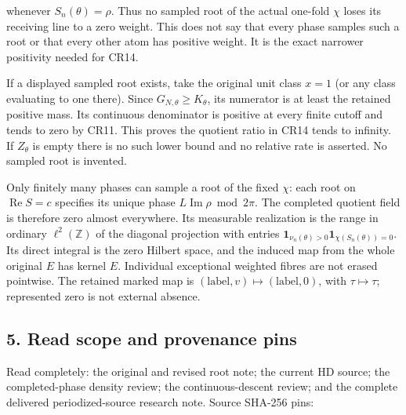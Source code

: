 \documentclass{article}
\begin{document}
whenever \(S_n(\theta)=\rho\). Thus no sampled root of the actual one-fold \(\chi\) loses its receiving line to a zero weight. This does not say that every phase samples such a root or that every other atom has positive weight. It is the exact narrower positivity needed for CR14.

If a displayed sampled root exists, take the original unit class \(x=1\) (or any class evaluating to one there). Since \(G_{N,\theta}\ge K_\theta\), its numerator is at least the retained positive mass. Its continuous denominator is positive at every finite cutoff and tends to zero by CR11. This proves the quotient ratio in CR14 tends to infinity. If \(Z_\theta\) is empty there is no such lower bound and no relative rate is asserted. No sampled root is invented.

Only finitely many phases can sample a root of the fixed \(\chi\): each root on \(\operatorname{Re}S=c\) specifies its unique phase \(L\operatorname{Im}\rho\bmod2\pi\). The completed quotient field is therefore zero almost everywhere. Its measurable realization is the range in ordinary \(\ell^2(\mathbb Z)\) of the diagonal projection with entries \(\mathbf1_{\nu_n(\theta)>0}\mathbf1_{\chi(S_n(\theta))=0}\). Its direct integral is the zero Hilbert space, and the induced map from the whole original \(E\) has kernel \(E\). Individual exceptional weighted fibres are not erased pointwise. The retained marked map is \((\mathrm{label},v)\longmapsto(\mathrm{label},0)\), with \(\tau\longmapsto\tau\); represented zero is not external absence.

\subsection{5. Read scope and provenance pins}\label{read-scope-and-provenance-pins}

Read completely: the original and revised root note; the current HD source; the completed-phase density review; the continuous-descent review; and the complete delivered periodized-source research note. Source SHA-256 pins:
\end{document}
